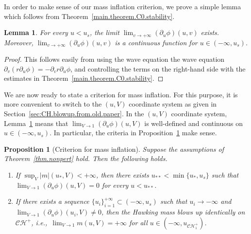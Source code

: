 \documentclass[10pt, reqno]{amsart}
\newtheorem{lemma}[theorem]{Lemma}
\newtheorem{proposition}[theorem]{Proposition}
\theoremstyle{definition}
\theoremstyle{remark}
\numberwithin{equation}{section}
\newcommand{\rd}{\partial}
\newcommand{\0}{\emptyset}
\newcommand{\calC}{\mathcal C}
\newcommand{\calH}{\mathcal H}
\newcommand{\CH}{\calC \calH^{+}}		%
\begin{document}
In order to make sense of our mass inflation criterion, we prove a simple lemma which follows from Theorem~\ref{main.theorem.C0.stability}.
\begin{lemma}\label{lem:cont.rduphi.limit}
For every $u <u_s$, the limit $\lim_{v\to +\infty}(\rd_u\phi)(u,v)$ exists. Moreover, $\lim_{v\to +\infty}(\rd_u\phi)(u,v)$ is a continuous function for $u \in (-\infty,u_s)$.
\end{lemma}
\begin{proof}
This follows easily from using the wave equation the wave equation $\rd_v (r\rd_u \phi) = -\rd_v r \rd_u \phi$, and controlling the terms on the right-hand side with the estimates in Theorem~\ref{main.theorem.C0.stability}. \qedhere
\end{proof}

We are now ready to state a criterion for mass inflation. For this purpose, it is more convenient to switch to the $(u,V)$ coordinate system as given in Section~\ref{sec:CH.blowup.from.old.paper}. In the $(u,V)$ coordinate system, Lemma~\ref{lem:cont.rduphi.limit} means that $\lim_{V\to 1}(\rd_u\phi)(u,V)$ is well-defined and continuous on $u \in (-\infty, u_s)$. In particular, the criteria in Proposition~\ref{basic.crit} make sense.
\begin{proposition}[Criterion for mass inflation]\label{basic.crit}
Suppose the assumptions of Theorem~\ref{thm.nonpert} hold. Then the following holds.
\begin{enumerate}
\item If $\sup_{V} |m|(u_*,V) <+\infty$, then there exists $u_{**} < \min\{ u_*, u_s\}$ such that $\lim_{V\to 1}(\rd_u\phi)(u,V)=0$ for every $u< u_{**}$.
\item If there exists a sequence $\{u_i\}_{i=1}^{+\infty}\subset (-\infty,u_s)$ such that $u_i \to -\infty$ and $\lim_{V\to 1}(\rd_u\phi)(u_i, V) \neq 0$, then the Hawking mass blows up identically on $\CH$, i.e.,~$\lim_{V\to 1} m(u,V) =+\infty$ for all $u \in (-\infty, u_{\CH_1})$.
\end{enumerate}
\end{proposition}
\end{document}
